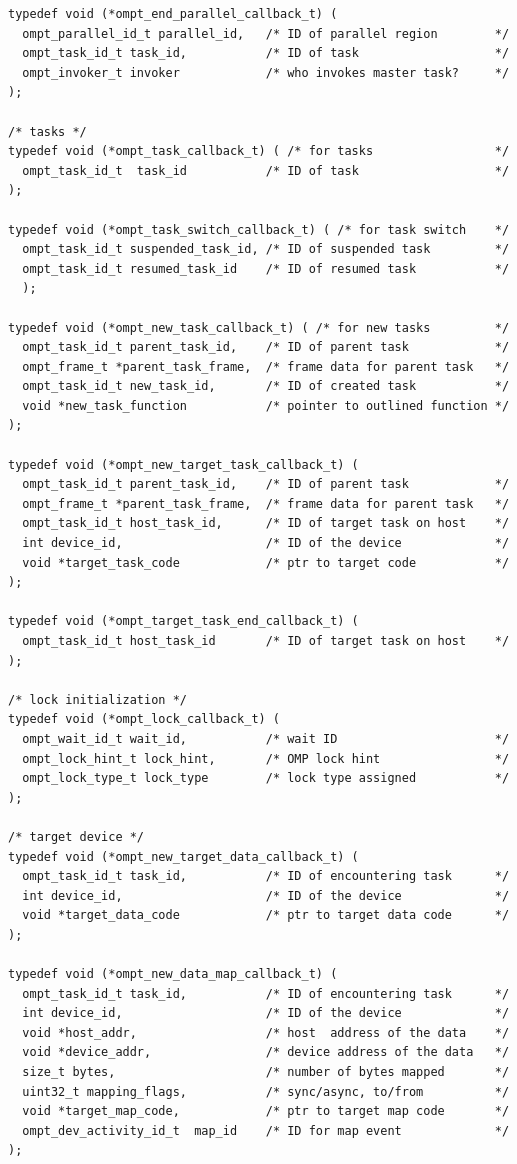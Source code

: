 \documentclass{article}
\begin{document}
{\begin{verbatim}
typedef void (*ompt_end_parallel_callback_t) (
  ompt_parallel_id_t parallel_id,   /* ID of parallel region        */
  ompt_task_id_t task_id,           /* ID of task                   */
  ompt_invoker_t invoker            /* who invokes master task?     */
);							    
		
/* tasks */						    						    
typedef void (*ompt_task_callback_t) ( /* for tasks                 */	   
  ompt_task_id_t  task_id           /* ID of task                   */
);

typedef void (*ompt_task_switch_callback_t) ( /* for task switch    */			   
  ompt_task_id_t suspended_task_id, /* ID of suspended task         */ 
  ompt_task_id_t resumed_task_id    /* ID of resumed task           */
  );								   

typedef void (*ompt_new_task_callback_t) ( /* for new tasks         */
  ompt_task_id_t parent_task_id,    /* ID of parent task            */
  ompt_frame_t *parent_task_frame,  /* frame data for parent task   */
  ompt_task_id_t new_task_id,       /* ID of created task           */
  void *new_task_function           /* pointer to outlined function */
);
  
typedef void (*ompt_new_target_task_callback_t) (
  ompt_task_id_t parent_task_id,    /* ID of parent task            */
  ompt_frame_t *parent_task_frame,  /* frame data for parent task   */
  ompt_task_id_t host_task_id,      /* ID of target task on host    */
  int device_id,                    /* ID of the device             */
  void *target_task_code            /* ptr to target code           */
);

typedef void (*ompt_target_task_end_callback_t) ( 	   
  ompt_task_id_t host_task_id       /* ID of target task on host    */
);

/* lock initialization */
typedef void (*ompt_lock_callback_t) (
  ompt_wait_id_t wait_id,           /* wait ID                      */
  ompt_lock_hint_t lock_hint,       /* OMP lock hint                */
  ompt_lock_type_t lock_type        /* lock type assigned           */ 
);

/* target device */
typedef void (*ompt_new_target_data_callback_t) ( 
  ompt_task_id_t task_id,           /* ID of encountering task      */
  int device_id,                    /* ID of the device             */
  void *target_data_code            /* ptr to target data code      */
);

typedef void (*ompt_new_data_map_callback_t) (
  ompt_task_id_t task_id,           /* ID of encountering task      */
  int device_id,                    /* ID of the device             */
  void *host_addr,                  /* host  address of the data    */
  void *device_addr,                /* device address of the data   */ 
  size_t bytes,                     /* number of bytes mapped       */
  uint32_t mapping_flags,           /* sync/async, to/from          */
  void *target_map_code,            /* ptr to target map code       */
  ompt_dev_activity_id_t  map_id    /* ID for map event             */
);


\end{verbatim}}
\end{document}
